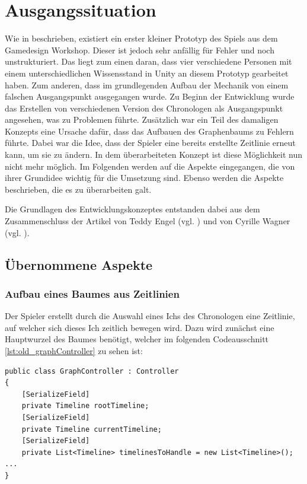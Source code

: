 \section{Ausgangssituation}
Wie in  beschrieben, existiert ein erster kleiner Prototyp des Spiels aus dem Gamedesign Workshop. Dieser ist jedoch sehr anfällig für Fehler und noch unstrukturiert. Das liegt zum einen daran, dass vier verschiedene Personen mit einem unterschiedlichen Wissensstand in Unity an diesem Prototyp gearbeitet haben. Zum anderen, dass im grundlegenden Aufbau der Mechanik von einem falschen Ausgangspunkt ausgegangen wurde. Zu Beginn der Entwicklung wurde das Erstellen von verschiedenen Version des Chronologen als Ausgangspunkt angesehen, was zu Problemen führte. Zusätzlich war ein Teil des damaligen Konzepts eine Ursache dafür, dass das Aufbauen des Graphenbaums zu Fehlern führte. Dabei war die Idee, dass der Spieler eine bereits erstellte Zeitlinie erneut  kann, um sie zu ändern. In dem überarbeiteten Konzept ist diese Möglichkeit nun nicht mehr möglich. Im Folgenden werden auf die Aspekte eingegangen, die von ihrer Grundidee wichtig für die Umsetzung sind. Ebenso werden die  Aspekte beschrieben, die es zu überarbeiten galt.

Die Grundlagen des Entwicklungskonzeptes entstanden dabei aus dem Zusammenschluss der Artikel  von Teddy Engel (vgl. \cite{engel_creating_2020}) und   von Cyrille Wagner (vgl. \cite{wagner_developing_2004}).
\subsection{Übernommene Aspekte}
\subsubsection{Aufbau eines Baumes aus Zeitlinien}\label{sec:good_01}
Der Spieler erstellt durch die Auswahl eines Ichs des Chronologen eine Zeitlinie, auf welcher sich dieses Ich zeitlich bewegen wird. Dazu wird zunächst eine Hauptwurzel des Baumes benötigt, welcher im folgenden Codeausschnitt \ref{lst:old_graphController} zu sehen ist:
\begin{lstlisting}[caption={Ausschnitt aus GraphController.cs aus dem alten Prototyp}, label={lst:old_graphController}]
public class GraphController : Controller
{
    [SerializeField]
    private Timeline rootTimeline;
    [SerializeField]
    private Timeline currentTimeline;
    [SerializeField]
    private List<Timeline> timelinesToHandle = new List<Timeline>();
...
}
\end{lstlisting}
\label{sec:rootTimeline_pld}

